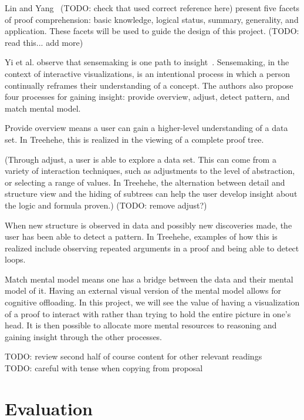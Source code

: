 \documentclass[conference]{IEEEtran}
\newcommand{\projectname}{Treehehe}
\begin{document}
Lin and Yang~\cite{readingcompgeometric-lin+yang} (TODO: check that used correct reference here) present five facets of proof comprehension: basic knowledge, logical status, summary, generality, and application. These facets will be used to guide the design of this project. (TODO: read this... add more)

Yi et al. observe that sensemaking is one path to insight~\cite{insights-yi+etal}. Sensemaking, in the context of interactive visualizations, is an intentional process in which a person continually reframes their understanding of a concept. The authors also propose four processes for gaining insight: provide overview, adjust, detect pattern, and match mental model.

Provide overview means a user can gain a higher-level understanding of a data set. In \projectname{}, this is realized in the viewing of a complete proof tree.

(Through adjust, a user is able to explore a data set. This can come from a variety of interaction techniques, such as adjustments to the level of abstraction, or selecting a range of values. In \projectname{}, the alternation between detail and structure view and the hiding of subtrees can help the user develop insight about the logic and formula proven.) (TODO: remove adjust?)

When new structure is observed in data and possibly new discoveries made, the user has been able to detect a pattern. In \projectname{}, examples of how this is realized include observing repeated arguments in a proof and being able to detect loops.

Match mental model means one has a bridge between the data and their mental model of it. Having an external visual version of the mental model allows for cognitive offloading. In this project, we will see the value of having a visualization of a proof to interact with rather than trying to hold the entire picture in one’s head. It is then possible to allocate more mental resources to reasoning and gaining insight through the other processes.

TODO: review second half of course content for other relevant readings \\

TODO: careful with tense when copying from proposal \\

\section{Evaluation}
\label{sec:evaluation}
\end{document}
